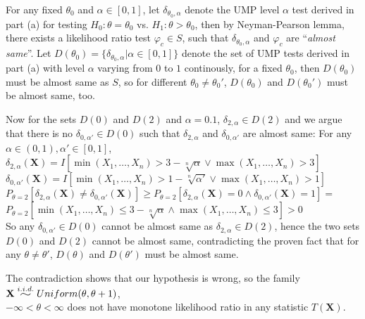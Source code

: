 For any fixed $\theta_0$ and $\alpha \in [0, 1]$, let $\delta_{\theta_0, \alpha}$ denote the UMP level $\alpha$ test derived in part (a) for testing $H_0: \theta=\theta_0$ vs. $H_1: \theta>\theta_0$,
then by Neyman-Pearson lemma, there exists a likelihood ratio test $\varphi_{c} \in S$, such that
$\delta_{\theta_0, \alpha}$ and $\varphi_{c}$ are ``\emph{almost same}''.
Let
$
D(\theta_0) = \{ \delta_{\theta_0, \alpha} | \alpha \in [0, 1] \}
$
denote the set of UMP tests derived in part (a) with level $\alpha$ varying from $0$ to $1$ continously, for a fixed $\theta_0$, then $D(\theta_0)$ must be almost same as $S$, so for different $\theta_0 \neq \theta_0'$, $D(\theta_0)$ and $D(\theta_0')$ must be almost same, too.

Now for the sets $D(0)$ and $D(2)$ and $\alpha = 0.1$,
$\delta_{2, \alpha} \in D(2)$ and we argue that there is no $\delta_{0, \alpha'} \in D(0)$ such that $\delta_{2, \alpha}$ and $\delta_{0, \alpha'}$ are almost same: For any $\alpha \in (0, 1), \alpha' \in [0, 1]$,\\
$
\delta_{2, \alpha}(\mathbf{X}) = I[\min(X_1, \dots, X_n) > 3-\sqrt[n]{\alpha} \vee \max(X_1, \dots, X_n) > 3]
$
\\
$
\delta_{0, \alpha'}(\mathbf{X}) = I[\min(X_1, \dots, X_n) > 1-\sqrt[n]{\alpha'} \vee \max(X_1, \dots, X_n) > 1]
$
\\
$
P_{\theta=2}[\delta_{2, \alpha}(\mathbf{X}) \neq \delta_{0, \alpha'}(\mathbf{X})]
\geq
P_{\theta=2}[\delta_{2, \alpha}(\mathbf{X})=0 \wedge \delta_{0, \alpha'}(\mathbf{X})=1]
=
$
\\
$
P_{\theta=2}[
\min(X_1, \dots, X_n) \leq 3-\sqrt[n]{\alpha} \wedge \max(X_1, \dots, X_n) \leq 3
] > 0
$
\\
So any $\delta_{0, \alpha'} \in D(0)$ cannot be almost same as $\delta_{2, \alpha} \in D(2)$, hence the two sets $D(0)$ and $D(2)$ cannot be almost same, contradicting the proven fact that for any $\theta \neq \theta'$, $D(\theta)$ and $D(\theta')$ must be almost same.

The contradiction shows that our hypothesis is wrong, so the family $\mathbf{X} \widesim{i.i.d.} Uniform(\theta, \theta+1)$, \\
$-\infty < \theta < \infty$ does not have monotone likelihood ratio in any statistic $T(\mathbf{X})$.


